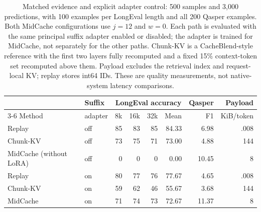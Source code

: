 \begin{table}[htbp]
\centering
\small
\setlength{\tabcolsep}{3.2pt}
\begin{tabular}{@{}llrrrrrr@{}}
\toprule
& Suffix & \multicolumn{4}{c}{LongEval accuracy} & Qasper & Payload \\
\cmidrule(lr){3-6}
Method & adapter & 8k & 16k & 32k & Mean & F1 & KiB/token \\
\midrule
Replay & off & 85 & 83 & 85 & 84.33 & 6.98 & .008 \\
Chunk-KV & off & 73 & 75 & 71 & 73.00 & 4.88 & 144 \\
MidCache (without LoRA) & off & 0 & 0 & 0 & 0.00 & 10.45 & 8 \\
\midrule
Replay & on & 80 & 77 & 76 & 77.67 & 4.65 & .008 \\
Chunk-KV & on & 59 & 62 & 46 & 55.67 & 3.68 & 144 \\
MidCache & on & 71 & 74 & 73 & 72.67 & 11.37 & 8 \\
\bottomrule
\end{tabular}
\caption{Matched evidence and explicit adapter control: 500 samples and 3,000 predictions, with 100 examples per LongEval length and all 200 Qasper examples. Both MidCache configurations use $j=12$ and $w=0$. Each path is evaluated with the same principal suffix adapter enabled or disabled; the adapter is trained for MidCache, not separately for the other paths. Chunk-KV is a CacheBlend-style reference with the first two layers fully recomputed and a fixed 15\% context-token set recomputed above them. Payload excludes the retrieval index and request-local KV; replay stores int64 IDs. These are quality measurements, not native-system latency comparisons.}
\label{tab:chunkkv}
\end{table}
